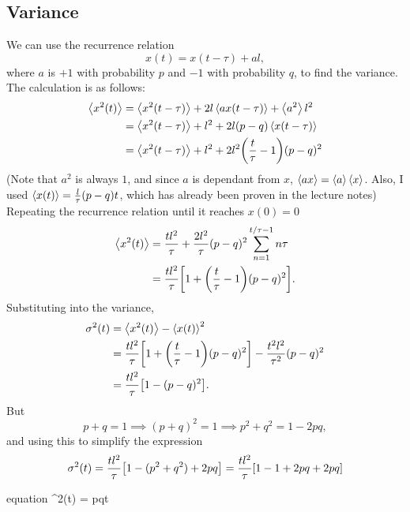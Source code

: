 \documentclass[12pt,a4paper]{article}
\begin{document}
	\subsection{Variance}
	We can use the recurrence relation
	\begin{equation}
		x(t) = x(t-\tau) + al,
	\end{equation}
	where $a$ is $+1$ with probability $p$ and $-1$ with probability $q$, to find the variance.
	The calculation is as follows:
	\begin{align}
		\expval{x^2(t)} &= \expval{x^2(t-\tau)} + 2l\expval{ax(t-\tau)} + \expval{a^2}l^2 \\
		&= \expval{x^2(t-\tau)} + l^2 + 2l(p - q)\expval{x(t-\tau)} \\
		&= \expval{x^2(t-\tau)} + l^2 + 2l^2\qty(\frac{t}{\tau}-1)(p - q)^2
	\end{align}
	(Note that $a^2$ is always $1$, and since $a$ is dependant from $x$, $\expval{ax} = \expval{a}\expval{x}$.
	Also, I used $\expval{x(t)} = \frac{l}{\tau}(p-q)t$, which has already been proven in the lecture notes) \\
	Repeating the recurrence relation until it reaches $x(0) = 0$
	\begin{align}
		\expval{x^2(t)} &= \frac{tl^2}{\tau} + \frac{2l^2}{\tau}(p - q)^2 \sum_{n=1}^{t/\tau - 1} n\tau \\
		&= \frac{tl^2}{\tau}\qty[1 + \qty(\frac{t}{\tau} - 1)(p - q)^2].
	\end{align}
	Substituting into the variance,
	\begin{align}
		\sigma^2(t) &= \expval{x^2(t)} - \expval{x(t)}^2 \\
		&= \frac{tl^2}{\tau}\qty[1 + \qty(\frac{t}{\tau} - 1)(p - q)^2] - \frac{t^2l^2}{\tau^2}(p-q)^2 \\
		&= \frac{tl^2}{\tau}\qty[1 - (p - q)^2].
	\end{align}
	But
	\begin{equation}
		p+q = 1 \implies (p+q)^2 = 1 \implies p^2 + q^2 = 1 - 2pq,
	\end{equation}
	and using this to simplify the expression
	\begin{equation}
		\sigma^2(t) = \frac{tl^2}{\tau}\qty[1 - (p^2 + q^2) + 2pq] = \frac{tl^2}{\tau}\qty[1 - 1 + 2pq + 2pq]
	\end{equation}
	\begin{empheq}[box=\fbox]{equation}
		\sigma^2(t) = pqt
	\end{empheq}
\end{document}
